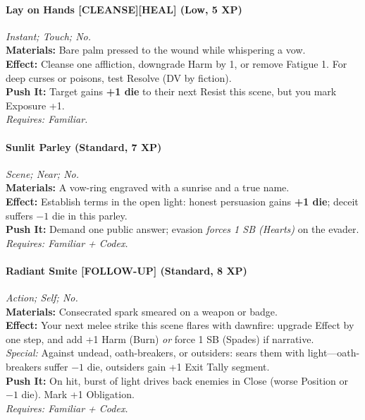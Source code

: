 \paragraph*{Lay on Hands \textnormal{[CLEANSE][HEAL]} (Low, 5 XP)} \emph{Instant; Touch; No.}\\
\textbf{Materials:} Bare palm pressed to the wound while whispering a vow.\\
\textbf{Effect:} Cleanse one affliction, downgrade Harm by 1, or remove Fatigue 1. For deep curses or poisons, test Resolve (DV by fiction).\\
\textbf{Push It:} Target gains \textbf{+1 die} to their next Resist this scene, but you mark Exposure +1.\\
\emph{Requires: Familiar.}

\paragraph{Sunlit Parley (Standard, 7 XP)} \emph{Scene; Near; No.}\\
\textbf{Materials:} A vow-ring engraved with a sunrise and a true name.\\
\textbf{Effect:} Establish terms in the open light: honest persuasion gains \textbf{+1 die}; deceit suffers \(-1\) die in this parley.\\
\textbf{Push It:} Demand one public answer; evasion \emph{forces 1 SB (Hearts)} on the evader.\\
\emph{Requires: Familiar + Codex.}

\paragraph{Radiant Smite \textnormal{[FOLLOW-UP]} (Standard, 8 XP)} \emph{Action; Self; No.}\\
\textbf{Materials:} Consecrated spark smeared on a weapon or badge.\\
\textbf{Effect:} Your next melee strike this scene flares with dawnfire: upgrade Effect by one step, and add +1 Harm (Burn) \emph{or} force 1 SB (Spades) if narrative.\\
\textit{Special:} Against undead, oath-breakers, or outsiders: sears them with light—oath-breakers suffer \(-1\) die, outsiders gain +1 Exit Tally segment.\\
\textbf{Push It:} On hit, burst of light drives back enemies in Close (worse Position or \(-1\) die). Mark +1 Obligation.\\
\emph{Requires: Familiar + Codex.}

